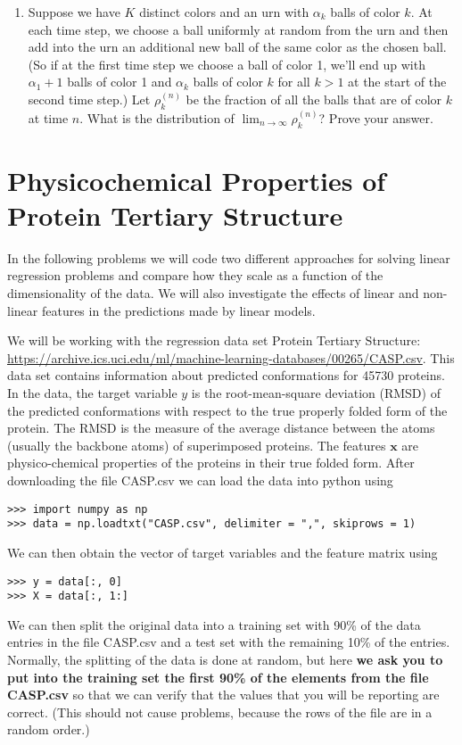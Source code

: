\documentclass[submit]{harvardml}
\begin{document}
\begin{problem}
\begin{enumerate}[label=(\alph*)]
\item Suppose we have $K$ distinct colors and an urn with $\alpha_k$ balls of color $k$. At each time step, we choose a ball uniformly at random from the urn and then add into the urn an additional new ball of the same color as the chosen ball. (So if at the first time step we choose a ball of color 1, we'll end up with $\alpha_1+1$ balls of color 1 and $\alpha_k$ balls of color $k$ for all $k > 1$ at the start of the second time step.) Let $\rho_{k}^{(n)}$ be the fraction of all the balls that are of color $k$ at time $n$. What is the distribution of $\lim_{n \rightarrow \infty} \rho_k^{(n)}$? Prove your answer.
\end{enumerate}
\vspace{0.1cm}
\end{problem}


\newpage
\section*{Physicochemical Properties of Protein Tertiary Structure}

In the following problems we will code two different approaches for
solving linear regression problems and compare how they scale as a function of
the dimensionality of the data.  We will also investigate the effects of
linear and non-linear features in the predictions made by linear models.

We will be working with the regression data set Protein
Tertiary Structure:
\url{https://archive.ics.uci.edu/ml/machine-learning-databases/00265/CASP.csv}.
This data set contains information about predicted conformations for 45730
proteins. In the data, the target variable $y$ is the root-mean-square
deviation (RMSD) of the predicted conformations with respect to the true properly
folded form of the protein. The RMSD is the measure of the average distance
between the atoms (usually the backbone atoms) of superimposed proteins.
The features $\mathbf{x}$ are
physico-chemical properties of the proteins in their true folded form. After
downloading the file CASP.csv we can load the data into python using
\begin{verbatim}
>>> import numpy as np
>>> data = np.loadtxt("CASP.csv", delimiter = ",", skiprows = 1)
\end{verbatim}
We can then obtain the vector of target variables and the feature matrix using
\begin{verbatim}
>>> y = data[:, 0]
>>> X = data[:, 1:]
\end{verbatim}
We can then split the original data into a training set with 90\% of the data
entries in the file CASP.csv and a test set with the remaining 10\% of the
entries. Normally, the splitting of the data is done at random, but here {\bf we ask
you to put into the training set the first 90\% of the elements from the
file CASP.csv} so that we can verify that the values that you will be reporting are correct.
(This should not cause problems, because the rows of the file are in a random order.)
\end{document}

